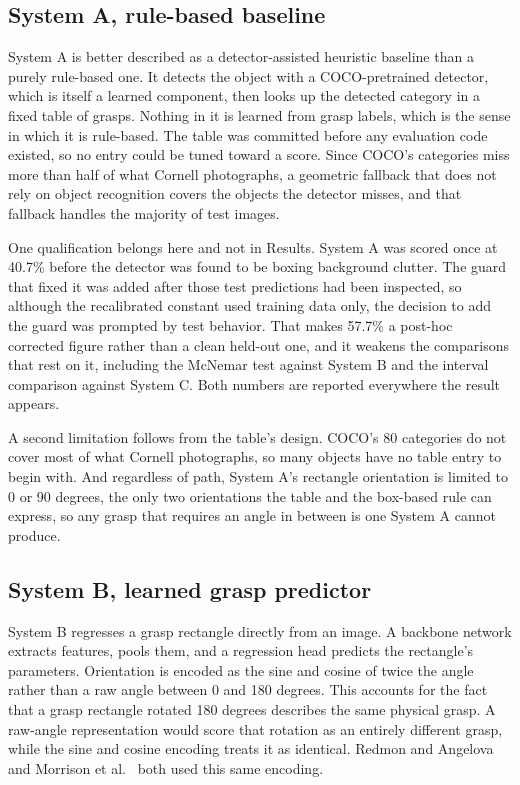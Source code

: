 \documentclass[12pt,letterpaper]{article}
\begin{document}
\subsection{System A, rule-based baseline}

System A is better described as a detector-assisted heuristic baseline
than a purely rule-based one. It detects the object with a
COCO-pretrained detector, which is itself a learned component, then
looks up the detected category in a fixed table of grasps. Nothing in
it is learned from grasp labels, which is the sense in which it is
rule-based. The table was committed before any evaluation code existed,
so no entry could be tuned toward a score. Since COCO's categories miss
more than half of what Cornell photographs, a geometric fallback that
does not rely on object recognition covers the objects the detector
misses, and that fallback handles the majority of test images.

One qualification belongs here and not in Results. System A was
scored once at 40.7\% before the detector was found to be boxing
background clutter. The guard that fixed it was added after those test
predictions had been inspected, so although the recalibrated constant
used training data only, the decision to add the guard was prompted by
test behavior. That makes 57.7\% a post-hoc corrected figure rather
than a clean held-out one, and it weakens the comparisons that rest on
it, including the McNemar test against System B and the interval
comparison against System C. Both numbers are reported everywhere the
result appears.

A second limitation follows from the table's design. COCO's 80
categories do not cover most of what Cornell photographs, so many
objects have no table entry to begin with. And regardless of path,
System A's rectangle orientation is limited to 0 or 90 degrees, the
only two orientations the table and the box-based rule can express, so
any grasp that requires an angle in between is one System A cannot
produce.

\subsection{System B, learned grasp predictor}

System B regresses a grasp rectangle directly from an image. A backbone
network extracts features, pools them, and a regression head predicts
the rectangle's parameters. Orientation is encoded as the sine and
cosine of twice the angle rather than a raw angle between 0 and 180
degrees. This accounts for the fact that a grasp rectangle rotated 180
degrees describes the same physical grasp. A raw-angle representation
would score that rotation as an entirely different grasp, while the
sine and cosine encoding treats it as identical. Redmon and Angelova~\cite{redmon2015} and Morrison et al.~\cite{morrison2018} both used this same encoding.
\end{document}
